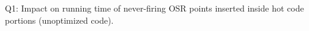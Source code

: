 \label{fig:code-quality-base} Q1: Impact on running time of never-firing OSR points inserted inside hot code portions (unoptimized code).
  
  
  